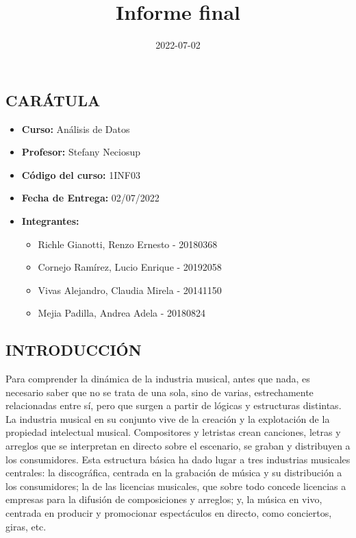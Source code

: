 \documentclass[
  letterpaper,
  DIV=11,
  numbers=noendperiod]{scrartcl}
\title{Informe final}
\author{}
\date{2022-07-02}
\providecommand{\tightlist}{%
  \setlength{\itemsep}{0pt}\setlength{\parskip}{0pt}}
\renewcommand*\contentsname{Table of contents}
\begin{document}
\maketitle

\renewcommand*\contentsname{Table of contents}
{
\hypersetup{linkcolor=}
\setcounter{tocdepth}{4}
\tableofcontents
}
\hypertarget{caruxe1tula}{%
\subsection{CARÁTULA}\label{caruxe1tula}}

\begin{itemize}
\item
  \textbf{Curso:} Análisis de Datos
\item
  \textbf{Profesor:} Stefany Neciosup
\item
  \textbf{Código del curso:} 1INF03
\item
  \textbf{Fecha de Entrega:} 02/07/2022
\item
  \textbf{Integrantes:}

  \begin{itemize}
  \tightlist
  \item
    Richle Gianotti, Renzo Ernesto - 20180368
  \item
    Cornejo Ramírez, Lucio Enrique - 20192058
  \item
    Vivas Alejandro, Claudia Mirela - 20141150
  \item
    Mejia Padilla, Andrea Adela - 20180824
  \end{itemize}
\end{itemize}

\hypertarget{introducciuxf3n}{%
\subsection{INTRODUCCIÓN}\label{introducciuxf3n}}

Para comprender la dinámica de la industria musical, antes que nada, es
necesario saber que no se trata de una sola, sino de varias,
estrechamente relacionadas entre sí, pero que surgen a partir de lógicas
y estructuras distintas. La industria musical en su conjunto vive de la
creación y la explotación de la propiedad intelectual musical.
Compositores y letristas crean canciones, letras y arreglos que se
interpretan en directo sobre el escenario, se graban y distribuyen a los
consumidores. Esta estructura básica ha dado lugar a tres industrias
musicales centrales: la discográfica, centrada en la grabación de música
y su distribución a los consumidores; la de las licencias musicales, que
sobre todo concede licencias a empresas para la difusión de
composiciones y arreglos; y, la música en vivo, centrada en producir y
promocionar espectáculos en directo, como conciertos, giras, etc.
\end{document}
